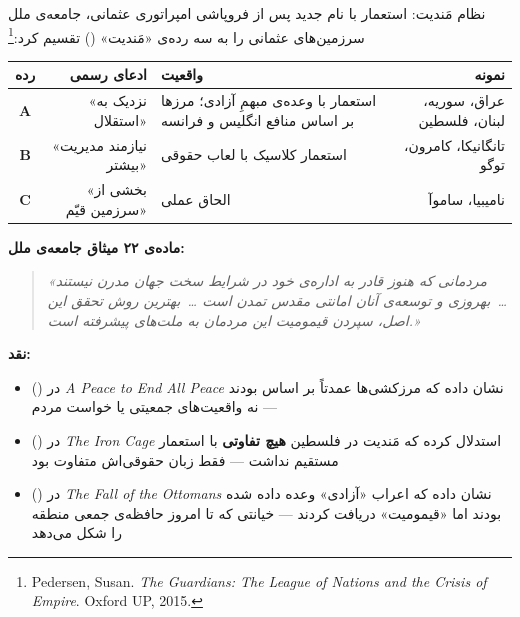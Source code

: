 \begin{caseStudy}{نظام مَندیت: استعمار با نام جدید}
پس از فروپاشی امپراتوری عثمانی، جامعه‌ی ملل سرزمین‌های عثمانی را به
سه رده‌ی «مَندیت» () تقسیم
کرد:\footnote{Pedersen, Susan.  \textit{The Guardians: The League of
Nations and the Crisis of Empire}.  Oxford UP, 2015.}

\begin{table}[H]
\centering
\begin{tabularx}{\textwidth}{c|r|X|r}
\toprule
\textbf{رده} & \textbf{ادعای رسمی} & \textbf{واقعیت} & \textbf{نمونه} \\
\midrule
\textbf{A} & «نزدیک به استقلال» &
  استعمار با وعده‌ی مبهمِ آزادی؛ مرزها بر اساس منافع
  انگلیس و فرانسه &
  عراق، سوریه، لبنان، فلسطین \\
\textbf{B} & «نیازمند مدیریت بیشتر» &
  استعمار کلاسیک با لعاب حقوقی &
  تانگانیکا، کامرون، توگو \\
\textbf{C} & «بخشی از سرزمین قیّم» &
  الحاق عملی &
  نامیبیا، ساموآ \\
\bottomrule
\end{tabularx}
\end{table}

\textbf{ماده‌ی ۲۲ میثاق جامعه‌ی ملل:}
\begin{quote}\itshape
«مردمانی که هنوز قادر به اداره‌ی خود در شرایط سخت جهان مدرن نیستند
\ldots\ بهروزی و توسعه‌ی آنان امانتی مقدس تمدن است \ldots\ بهترین روش
تحقق این اصل، سپردن قیمومیت این مردمان به ملت‌های پیشرفته است.»
\end{quote}

\textbf{نقد:}
\begin{itemize}
\item {} () در
  \textit{A Peace to End All Peace}  نشان داده که
  مرزکشی‌ها عمدتاً بر اساس 
   بودند — نه واقعیت‌های جمعیتی یا خواست مردم
\item {} () در
  \textit{The Iron Cage}  استدلال کرده
  که مَندیت در فلسطین \textbf{هیچ تفاوتی} با استعمار مستقیم نداشت —
  فقط زبان حقوقی‌اش متفاوت بود
\item {} () در
  \textit{The Fall of the Ottomans}  نشان داده
  که اعراب «آزادی» وعده داده شده بودند اما «قیمومیت» دریافت کردند — خیانتی
  که تا امروز حافظه‌ی جمعی منطقه را شکل می‌دهد
\end{itemize}
\end{caseStudy}

